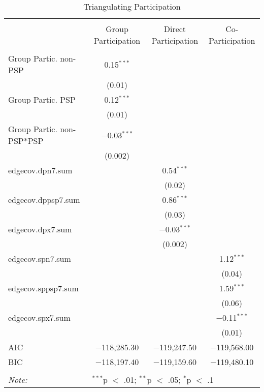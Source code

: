 
\begin{table}[!htbp] \centering 
  \caption{Triangulating Participation} 
  \label{table:partmods} 
\begin{tabular}{@{\extracolsep{5pt}}lccc} 
\\[-1.8ex]\hline \\[-1.8ex] 
 & Group Participation & Direct Participation & Co-Participation \\ 
\hline \\[-1.8ex] 
 Group Partic. non-PSP & 0.15$^{***}$ &  &  \\ 
  & (0.01) &  &  \\ 
  Group Partic. PSP & 0.12$^{***}$ &  &  \\ 
  & (0.01) &  &  \\ 
  Group Partic. non-PSP*PSP & $-$0.03$^{***}$ &  &  \\ 
  & (0.002) &  &  \\ 
  edgecov.dpn7.sum &  & 0.54$^{***}$ &  \\ 
  &  & (0.02) &  \\ 
  edgecov.dppsp7.sum &  & 0.86$^{***}$ &  \\ 
  &  & (0.03) &  \\ 
  edgecov.dpx7.sum &  & $-$0.03$^{***}$ &  \\ 
  &  & (0.002) &  \\ 
  edgecov.spn7.sum &  &  & 1.12$^{***}$ \\ 
  &  &  & (0.04) \\ 
  edgecov.sppsp7.sum &  &  & 1.59$^{***}$ \\ 
  &  &  & (0.06) \\ 
  edgecov.spx7.sum &  &  & $-$0.11$^{***}$ \\ 
  &  &  & (0.01) \\ 
 AIC & $-$118,285.30 & $-$119,247.50 & $-$119,568.00 \\ 
BIC & $-$118,197.40 & $-$119,159.60 & $-$119,480.10 \\ 
\hline \\[-1.8ex] 
\textit{Note:} & \multicolumn{3}{l}{$^{***}$p $<$ .01; $^{**}$p $<$ .05; $^{*}$p $<$ .1} \\ 
\end{tabular} 
\end{table} 

